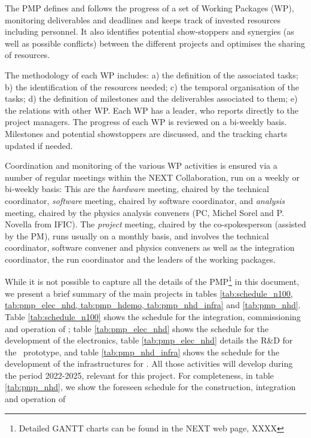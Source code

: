 \indent
 
The PMP defines and follows the progress of a set of Working Packages (WP), monitoring deliverables and deadlines and keeps track of invested resources including personnel. It also identifies potential show-stoppers and synergies (as well as possible conflicts) between the different projects and optimises the sharing of resources. 

\indent

The methodology of each WP includes: a) the definition of the associated tasks; b) the identification of the resources needed; c) the temporal organisation of the tasks; d) the definition of milestones and the deliverables associated to them; e) the relations with other WP. Each WP has a leader, who reports directly to the project managers. The progress of each WP is reviewed on a bi-weekly basis. Milestones and potential showstoppers are discussed, and the tracking charts updated if needed.

Coordination and monitoring of the various WP activities is ensured via a number of regular meetings within the NEXT Collaboration, run on a weekly or bi-weekly basis: This are the  {\em hardware} meeting, chaired by the technical coordinator, {\em software} meeting, chaired by software coordinator, and {\em analysis} meeting, chaired by the physics analysis conveners (PC, Michel Sorel and P. Novella from IFIC). The {\em project} meeting, chaired by the co-spokesperson (assisted by the PM), runs usually on a monthly basis, and involves the technical coordinator, software convener and physics conveners as well as the integration coordinator, the run coordinator and the leaders of the working packages. 

\indent

While it is not possible to capture all the details of the PMP\footnote{Detailed GANTT charts can be found in the NEXT web page, XXXX} in this document, we present a brief summary of the main projects in tables \ref{tab:schedule_n100, tab:pmp_elec_nhd, tab:pmp_hdemo, tab:pmp_nhd_infra} and
\ref{tab:pmp_nhd}. Table  \ref{tab:schedule_n100} shows the schedule for the integration, commissioning and operation of \Next; 
table \ref{tab:pmp_elec_nhd} shows the schedule for the development of the electronics, table  \ref{tab:pmp_elec_nhd} details the R\&D for the \HDEMO\ prototype, and table \ref{tab:pmp_nhd_infra} shows the schedule for the development of the infrastructures for \NHD. All those activities will develop during the period
2022-2025, relevant for this project. For completeness, in table \ref{tab:pmp_nhd}, we show the foreseen schedule for the construction, integration and operation of \NHD







